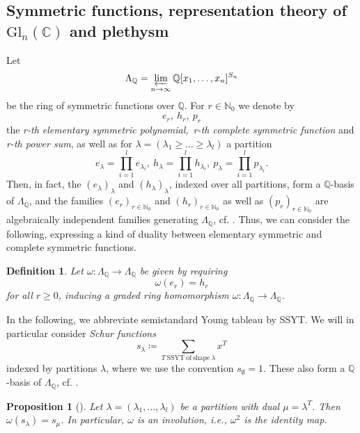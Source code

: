 \documentclass[a4paper]{amsart}
\newtheorem{proposition}{Proposition}
\newtheorem{definition}{Definition}
\def\N{{\mathbb{N}}}
\def\C{{\mathbb{C}}}
\def\Q{{\mathbb{Q}}}
\begin{document}
\subsection{Symmetric functions, representation theory of $\mathrm{Gl}_n(\C)$ and plethysm}
Let
\begin{displaymath}
	\Lambda_\Q=\varprojlim\limits_{n\to\infty}\Q[x_1,\ldots,x_n]^{S_n}
\end{displaymath}
be the ring of symmetric functions over $\Q$.
For $r\in\N_0$ we denote by 
\begin{displaymath}
	e_r,\
	h_r,\
	p_r
\end{displaymath}
the \textit{r-th elementary symmetric polynomial,\ r-th complete symmetric function} and \textit{r-th power sum},
as well as for $\lambda=(\lambda_1\geq \ldots\geq\lambda_l)$ a partition
\begin{displaymath}
	e_\lambda=\prod\limits_{i=1}^le_{\lambda_i},\
	h_\lambda=\prod\limits_{i=1}^lh_{\lambda_i},\
	p_\lambda=\prod\limits_{i=1}^lp_{\lambda_i}.
\end{displaymath}
Then, in fact, the $(e_{\lambda})_{\lambda}$ and $(h_{\lambda})_{\lambda}$, indexed over all partitions, form a $\mathbb Q$-basis of $\Lambda_{\mathbb Q}$, and the families $(e_r)_{r\in\N_0}$ and $(h_r)_{r\in\N_0}$ as well as $(p_r)_{r\in\N_0}$ are algebraically independent families generating $\Lambda_{\Q}$, cf. \cite[Thm. 7.4.4, Cor. 7.5.2, Cor. 7.7.2]{Sta99}.
Thus, we can consider the following, expressing a kind of duality between elementary symmetric and complete symmetric functions.
\begin{definition}
	Let $\omega:\Lambda_\Q\to\Lambda_\Q$ be given by requiring
	\begin{displaymath}
		\omega(e_r)=h_r
	\end{displaymath}
	for all $r\geq0$, inducing a graded ring homomorphism $\omega:\Lambda_\Q\to\Lambda_\Q$.
\end{definition}
	In the following, we abbreviate semistandard Young tableau by SSYT.	
	We will in particular consider \textit{Schur functions} 
	\begin{displaymath}
		s_\lambda\coloneqq
		\sum\limits_{T\mathrm{\ SSYT\ of\ shape\ }\lambda}x^T
	\end{displaymath}
	indexed by partitions $\lambda$,
	where we use the convention $s_\emptyset=1$.
	These also form a $\Q$-basis of $\Lambda_\Q$, cf. \cite[Cor. 7.10.6]{Sta99}.
\begin{proposition}[{\cite[I.3, ex. 1]{Mac98}}]\label{symf:cor3}\label{symf:prop3}
	Let $\lambda=(\lambda_1,\ldots,\lambda_l)$ be a partition with dual $\mu=\lambda^T$.
	Then $\omega(s_\lambda)=s_{\mu}$.
	In particular, $\omega$ is an involution, i.e., $\omega^2$ is the identity map.
\end{proposition}
\end{document}
